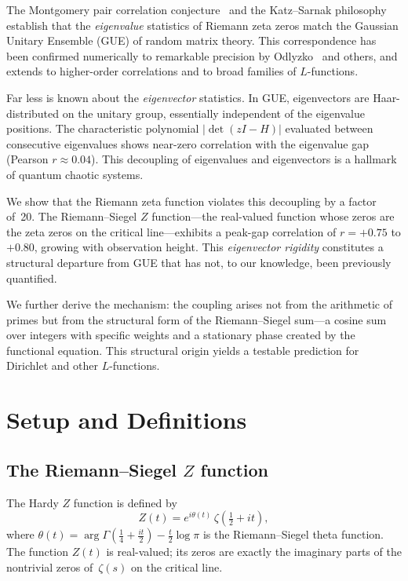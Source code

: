 \documentclass[11pt,a4paper]{article}
\begin{document}
The Montgomery pair correlation conjecture~\cite{Montgomery1973} and the Katz--Sarnak philosophy~\cite{KatzSarnak1999} establish that the \emph{eigenvalue} statistics of Riemann zeta zeros match the Gaussian Unitary Ensemble (GUE) of random matrix theory.
This correspondence has been confirmed numerically to remarkable precision by Odlyzko~\cite{Odlyzko2001} and others, and extends to higher-order correlations and to broad families of $L$-functions.

Far less is known about the \emph{eigenvector} statistics.
In GUE, eigenvectors are Haar-distributed on the unitary group, essentially independent of the eigenvalue positions.
The characteristic polynomial $|\det(zI - H)|$ evaluated between consecutive eigenvalues shows near-zero correlation with the eigenvalue gap (Pearson $r \approx 0.04$).
This decoupling of eigenvalues and eigenvectors is a hallmark of quantum chaotic systems.

We show that the Riemann zeta function violates this decoupling by a factor of~20.
The Riemann--Siegel $Z$ function---the real-valued function whose zeros are the zeta zeros on the critical line---exhibits a peak-gap correlation of $r = +0.75$ to $+0.80$, growing with observation height.
This \emph{eigenvector rigidity} constitutes a structural departure from GUE that has not, to our knowledge, been previously quantified.

We further derive the mechanism: the coupling arises not from the arithmetic of primes but from the structural form of the Riemann--Siegel sum---a cosine sum over integers with specific weights and a stationary phase created by the functional equation.
This structural origin yields a testable prediction for Dirichlet and other $L$-functions.

\section{Setup and Definitions}

\subsection{The Riemann--Siegel $Z$ function}

The Hardy $Z$ function is defined by
\begin{equation}\label{eq:Z}
Z(t) = e^{i\theta(t)}\,\zeta\!\left(\tfrac{1}{2} + it\right),
\end{equation}
where $\theta(t) = \arg\Gamma\!\left(\tfrac{1}{4} + \tfrac{it}{2}\right) - \tfrac{t}{2}\log\pi$ is the Riemann--Siegel theta function.
The function $Z(t)$ is real-valued; its zeros are exactly the imaginary parts of the nontrivial zeros of~$\zeta(s)$ on the critical line.
\end{document}
